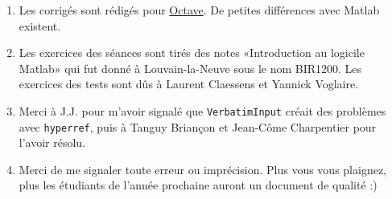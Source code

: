 \begin{enumerate}

	\item
		Les corrigés sont rédigés pour \href{http://qtoctave.wordpress.com/}{Octave}. De petites différences avec Matlab existent.
	\item
		Les exercices des séances sont tirés des notes «Introduction au logicile Matlab» qui fut donné à Louvain-la-Neuve sous le nom BIR1200.  Les exercices des tests sont dûs à Laurent Claessens et Yannick Voglaire.
    \item
        Merci à J.J. pour m'avoir signalé que \texttt{VerbatimInput} créait des problèmes avec \texttt{hyperref}, puis à Tanguy Briançon et Jean-Côme Charpentier pour l'avoir résolu.
	\item
		Merci de me signaler toute erreur ou imprécision. Plus vous vous plaignez, plus les étudiants de l'année prochaine auront un document de qualité :)
\end{enumerate}



